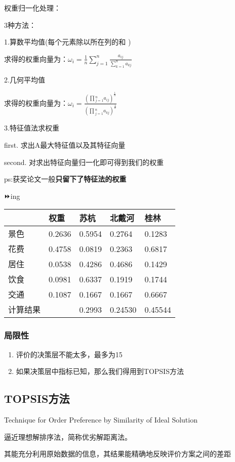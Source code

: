 \documentclass[
]{article}
\begin{document}
权重归一化处理：

3种方法：

1.算数平均值(每个元素除以所在列的和 )

求得的权重向量为：\(ω_i={\frac{1}{n}}{\sum_{j=1}^n\frac{a_{ij}}{\sum_{k=1}^na_{kj}}}\)

2.几何平均值

求得的权重向量为：\(ω_i= \frac{(\prod{_{j=1}^n{a_{ij}}})^{\frac{1}{n}}}{(\prod{_{j=1}^n{a_{kj}}})^{\frac{1}{n}}}\)

3.特征值法求权重

first. 求出A最大特征值以及其特征向量

second. 对求出特征向量归一化即可得到我们的权重

ps:获奖论文一般\textbf{只留下了特征法的权重}

⏩ing

\begin{longtable}[]{@{}lllll@{}}
\toprule
& 权重 & 苏杭 & 北戴河 & 桂林\tabularnewline
\midrule
\endhead
景色 & 0.2636 & 0.5954 & 0.2764 & 0.1283\tabularnewline
花费 & 0.4758 & 0.0819 & 0.2363 & 0.6817\tabularnewline
居住 & 0.0538 & 0.4286 & 0.4686 & 0.1429\tabularnewline
饮食 & 0.0981 & 0.6337 & 0.1919 & 0.1744\tabularnewline
交通 & 0.1087 & 0.1667 & 0.1667 & 0.6667\tabularnewline
计算结果 & & 0.2993 & 0.24530 & 0.45544\tabularnewline
\bottomrule
\end{longtable}

\hypertarget{ux5c40ux9650ux6027}{%
\subsubsection{局限性}\label{ux5c40ux9650ux6027}}

\begin{enumerate}
\def\labelenumi{\arabic{enumi}.}
\item
  评价的决策层不能太多，最多为15
\item
  如果决策层中指标已知，那么我们得用到TOPSIS方法
\end{enumerate}

\hypertarget{topsisux65b9ux6cd5}{%
\subsection{TOPSIS方法}\label{topsisux65b9ux6cd5}}

Technique for Order Preference by Similarity of Ideal Solution

逼近理想解排序法，简称优劣解距离法。

其能充分利用原始数据的信息，其结果能精确地反映评价方案之间的差距
\end{document}
